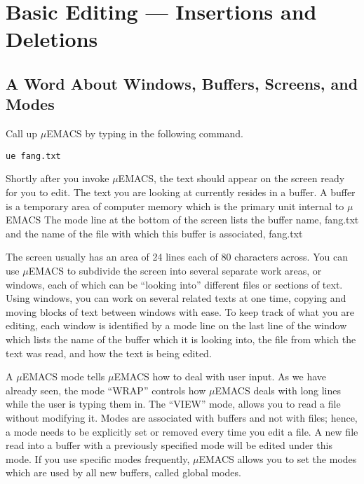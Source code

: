 \chapter{Basic Editing --- Insertions and Deletions}

\section{A Word About Windows, Buffers, Screens, and Modes}

Call up $\mu$EMACS by typing in the following command.

\begin{verbatim}
ue fang.txt
\end{verbatim}

Shortly after you invoke $\mu$EMACS, the text should appear on the
screen ready for you to edit. The text you are looking at currently
resides in a buffer. A buffer is a temporary area of computer memory
which is the primary unit internal to $\mu$EMACS The mode line at the
bottom of the screen lists the buffer name, fang.txt and the name of
the file with which this buffer is associated, fang.txt

The screen usually has an area of 24 lines each of 80 characters
across. You can use $\mu$EMACS to subdivide the screen into several
separate work areas, or windows, each of which can be ``looking into''
different files or sections of text. Using windows, you can work on
several related texts at one time, copying and moving blocks of text
between windows with ease. To keep track of what you are editing, each
window is identified by a mode line on the last line of the window
which lists the name of the buffer which it is looking into, the file
from which the text was read, and how the text is being edited.

A $\mu$EMACS mode tells $\mu$EMACS how to deal with user input. As we
have already seen, the mode ``WRAP'' controls how $\mu$EMACS deals with
long lines while the user is typing them in. The ``VIEW'' mode, allows
you to read a file without modifying it. Modes are associated with
buffers and not with files; hence, a mode needs to be explicitly set or
removed every time you edit a file. A new file read into a buffer with
a previously specified mode will be edited under this mode. If you use
specific modes frequently, $\mu$EMACS allows you to set the modes which
are used by all new buffers, called global modes.

